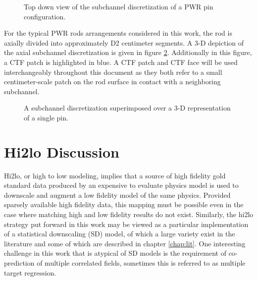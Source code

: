 \begin{figure}[H]
	\centering
	
	\caption{Top down view of the subchannel discretization of a PWR pin configuration.}
	\label{fig:ctf_subchannel}
\end{figure}

For the typical PWR rods arrangements considered in this work, the rod is axially divided into approximately D2 centimeter segments.  A 3-D depiction of the axial subchannel discretization is given in figure \ref{fig:ctf_axial_dis}.  Additionally in this figure, a CTF patch is highlighted in blue.  A CTF patch and CTF face will be used interchangeably throughout this document as they both refer to a small centimeter-scale patch on the rod surface in contact with a neighboring subchannel.

\begin{figure}[H]
	\centering
	
	\caption{A subchannel discretization superimposed over a 3-D representation of a single pin.}
	\label{fig:ctf_axial_dis}
\end{figure}


\section{Hi2lo Discussion}

Hi2lo, or high to low modeling, implies that a source of high fidelity gold standard data produced by an expensive to evaluate physics model is used to downscale and augment a low fidelity model of the same physics.
Provided sparsely available high fidelity data, this mapping must be possible even in the case where matching high and low fidelity results do not exist.  Similarly, the hi2lo strategy put forward in this work may be viewed as a particular implementation of a statistical downscaling (SD) model, of which a large variety exist in the literature and some of which are described in chapter \ref{chap:lit}.  One interesting challenge in this work that is atypical of SD models is the requirement of co-prediction of multiple correlated fields, sometimes this is referred to as multiple target regression.


